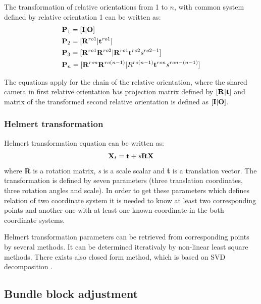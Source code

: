\documentclass[a4paper,12pt]{article}
\newcommand{\ematr}[1]{
{\bf #1}
}
\newcommand{\evect}[1]{
{\bf #1}
}
\newcommand{\escal}[1]{
{\it #1}
}
\begin{document}
The transformation of relative orientations from 1 to $n$, with common system defined by relative orientation 1 can be written as: 
\begin{equation}
\label{eq:comm_rel}
\begin{split}
&\ematr{P}_{1} = [\ematr{I}|\evect{O}] \\
&\ematr{P}_{2} = [\ematr{R}^{ro1}|\evect{t}^{ro1}] \\
&\ematr{P}_{3} = [\ematr{R}^{ro1} \ematr{R}^{ro2}| \ematr{R}^{ro1} \evect{t}^{ro2} \escal{s}^{ro2-1}] \\
&\ematr{P}_{n} = [\ematr{R}^{ron} \ematr{R}^{ro(n - 1)}| R^{ro(n - 1)} \evect{t}^{ron} {s}^{ron- (n-1)}] \\
\end{split}
\end{equation}


The equations apply for the chain of the relative orientation, where the shared camera in first relative orientation has 
projection matrix defined by $[\ematr{R}|\evect{t}]$ and matrix of the transformed second relative orientation is 
defined as $[\ematr{I}|\ematr{O}]$.

\subsubsection{Helmert transformation}
\label{sec:helmert}

Helmert transformation equation can be written as:
\begin{equation}
\ematr{X}_{t} = \evect{t} + \escal{s}\ematr{R}\evect{X} \\
\end{equation}
where \ematr{R} is a rotation matrix, \escal{s} is a scale scalar and  \evect{t} is a translation vector.
The transformation is defined by seven parameters (three translation coordinates, three rotation angles and scale).
In order to get these parameters which defines relation of two coordinate system it is needed to know at least two corresponding points and  another one with 
at least one known coordinate in the both coordinate systems. 


Helmert transformation parameters can be retrieved from corresponding points by several methods. It can be determined
iterativaly by non-linear least square methods. There exists also closed form method, which is based on SVD decomposition
\cite{sjoberg2013closed}.


\subsection{Bundle block adjustment}
\end{document}

